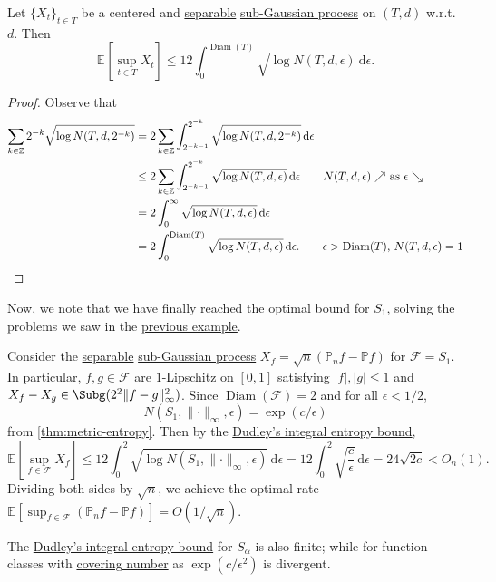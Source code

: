 \begin{corollary}\label{col:Dudley-integral-entropy-bound}
	Let \(\{ X_t \} _{t\in T}\) be a centered and \hyperref[def:separable]{separable} \hyperref[def:sub-Gaussian-process]{sub-Gaussian process} on \((T, d)\) w.r.t.\ \(d\). Then
	\[
		\mathbb{E}_{}\left[\sup _{t\in T} X_t \right] \leq 12 \int_{0}^{\mathop{\mathrm{Diam}}(T) }\sqrt{\log N(T, d, \epsilon )} \,\mathrm{d}\epsilon.
	\]
\end{corollary}
\begin{proof}
	Observe that
	\begin{align*}
		\sum_{k\in \mathbb{Z} } 2^{-k} \sqrt{\log N(T, d, 2^{-k})}
		 & = 2 \sum_{k\in \mathbb{Z} } \int_{2^{-k-1}}^{2^{-k}} \sqrt{\log N(T, d, 2^{-k})}  \,\mathrm{d} \epsilon                                                                        \\
		 & \leq 2 \sum_{k\in \mathbb{Z} } \int_{2^{-k-1}}^{2^{-k}} \sqrt{\log N(T, d, \epsilon )} \,\mathrm{d} \epsilon \tag*{\(N(T, d, \epsilon ) \nearrow \) as \(\epsilon \searrow \)} \\
		 & = 2 \int_{0}^{\infty} \sqrt{\log N(T, d, \epsilon )} \,\mathrm{d}\epsilon                                                                                                      \\
		 & = 2 \int_{0}^{\mathop{\mathrm{Diam}}(T) } \sqrt{\log N(T, d, \epsilon )} \,\mathrm{d}\epsilon. \tag*{\(\epsilon > \mathop{\mathrm{Diam}}(T) \), \(N(T, d, \epsilon ) = 1\)}
	\end{align*}
\end{proof}

Now, we note that we have finally reached the optimal bound for \(S_1\), solving the problems we saw in the \hyperref[eg:non-optimal-EP-supremum-S1]{previous example}.

\begin{eg}\label{eg:optimal-EP-supremum-S1}
	Consider the \hyperref[def:separable]{separable} \hyperref[def:sub-Gaussian-process]{sub-Gaussian process} \(X_f = \sqrt{n} (\mathbb{P} _n f - \mathbb{P} f)\) for \(\mathscr{F} = S_1\). In particular, \(f, g\in \mathscr{F} \) are \(1\)-Lipschitz on \([0, 1]\) satisfying \(\vert f \vert , \vert g \vert \leq 1\) and \(X_f - X_g\in \Subg(2^2 \lVert f - g \rVert ^2_\infty )\). Since \(\mathop{\mathrm{Diam}}(\mathscr{F} ) = 2 \) and for all \(\epsilon < 1 / 2\),
	\[
		N(S_1, \lVert \cdot \rVert _\infty , \epsilon ) = \exp (c / \epsilon )
	\]
	from \autoref{thm:metric-entropy}. Then by the \hyperref[col:Dudley-integral-entropy-bound]{Dudley's integral entropy bound},
	\[
		\mathbb{E}_{}\left[\sup _{f\in \mathscr{F} } X_f \right]
		\leq 12\int_{0}^{2} \sqrt{\log N(S_1, \lVert \cdot \rVert _\infty , \epsilon )} \,\mathrm{d}\epsilon
		= 12 \int_{0}^{2} \sqrt{\frac{c}{\epsilon }} \,\mathrm{d}\epsilon
		= 24 \sqrt{2c}
		< O_n(1).
	\]
	Dividing both sides by \(\sqrt{n} \), we achieve the optimal rate \(\mathbb{E}_{}\left[\sup _{f\in \mathscr{F} } (\mathbb{P} _n f - \mathbb{P} f) \right] = O(1 / \sqrt{n} )\).
\end{eg}

\begin{remark}
	The \hyperref[col:Dudley-integral-entropy-bound]{Dudley's integral entropy bound} for \(S_\alpha \) is also finite; while for function classes with \hyperref[def:covering-number]{covering number} as \(\exp (c / \epsilon ^2)\) is divergent.
\end{remark}